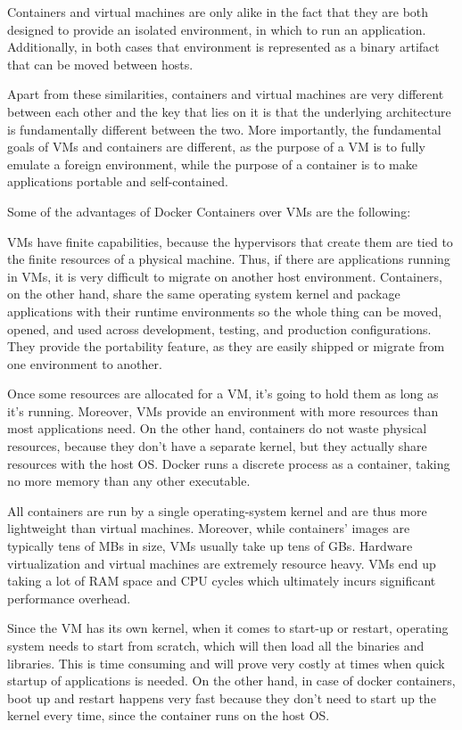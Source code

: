 Containers and virtual machines are only alike in the fact that they are both designed to provide an isolated environment, in which to run an application. Additionally, in both cases that environment is represented as a binary artifact that can be moved between hosts.

Apart from these similarities, containers and virtual machines are very different between each other and the key that lies on it is that the underlying architecture is fundamentally different between the two. More importantly, the fundamental goals of VMs and containers are different, as the purpose of a VM is to fully emulate a foreign environment, while the purpose of a container is to make applications portable and self-contained. \cite{bookdock}

Some of the advantages of Docker Containers over VMs are the following:
\begin{description}[style=nextline]
\item[Portability]
VMs have finite capabilities, because the hypervisors that create them are tied to the finite resources of a physical machine. Thus, if there are applications running in VMs, it is very difficult to migrate on another host environment. Containers, on the other hand, share the same operating system kernel and package applications with their runtime environments so the whole thing can be moved, opened, and used across development, testing, and production configurations. They provide the portability feature, as they are easily shipped or migrate from one environment to another.

\item[Resource management]
Once some resources are allocated for a VM, it's going to hold them as long as it's running. Moreover, VMs provide an environment with more resources than most applications need. On the other hand, containers do not waste physical resources, because they don't have a separate kernel, but they actually share resources with the host OS. Docker runs a discrete process as a container, taking no more memory than any other executable.

\item[Size and overhead]
All containers are run by a single operating-system kernel and are thus more lightweight than virtual machines. Moreover, while containers' images are typically tens of MBs in size, VMs usually take up tens of GBs. Hardware virtualization and virtual machines are extremely resource heavy. VMs end up taking a lot of RAM space and CPU cycles which ultimately incurs significant performance overhead.

\item[Boot up time]
Since the VM has its own kernel, when it comes to start-up or restart, operating system needs to start from scratch, which will then load all the binaries and libraries. This is time consuming and will prove very costly at times when quick startup of applications is needed.
On the other hand, in case of docker containers, boot up and restart happens very fast because they don't need to start up the kernel every time, since the container runs on the host OS.
\end{description}
